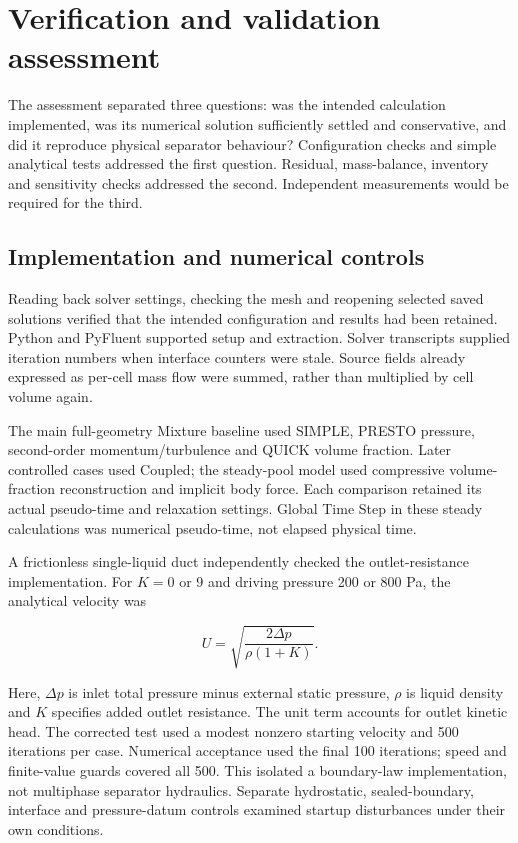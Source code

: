 \section{Verification and validation assessment}

The assessment separated three questions: was the intended calculation implemented, was its numerical solution sufficiently settled and conservative, and did it reproduce physical separator behaviour? Configuration checks and simple analytical tests addressed the first question. Residual, mass-balance, inventory and sensitivity checks addressed the second. Independent measurements would be required for the third.

\subsection{Implementation and numerical controls}

Reading back solver settings, checking the mesh and reopening selected saved solutions verified that the intended configuration and results had been retained. Python and PyFluent supported setup and extraction. Solver transcripts supplied iteration numbers when interface counters were stale. Source fields already expressed as per-cell mass flow were summed, rather than multiplied by cell volume again.

The main full-geometry Mixture baseline used SIMPLE, PRESTO pressure, second-order momentum/turbulence and QUICK volume fraction. Later controlled cases used Coupled; the steady-pool model used compressive volume-fraction reconstruction and implicit body force. Each comparison retained its actual pseudo-time and relaxation settings. Global Time Step in these steady calculations was numerical pseudo-time, not elapsed physical time.

A frictionless single-liquid duct independently checked the outlet-resistance implementation. For \(K=0\) or 9 and driving pressure 200 or 800 Pa, the analytical velocity was

\[U=\sqrt{\frac{2\Delta p}{\rho(1+K)}}.\]

Here, \(\Delta p\) is inlet total pressure minus external static pressure, \(\rho\) is liquid density and \(K\) specifies added outlet resistance. The unit term accounts for outlet kinetic head. The corrected test used a modest nonzero starting velocity and 500 iterations per case. Numerical acceptance used the final 100 iterations; speed and finite-value guards covered all 500. This isolated a boundary-law implementation, not multiphase separator hydraulics. Separate hydrostatic, sealed-boundary, interface and pressure-datum controls examined startup disturbances under their own conditions.


